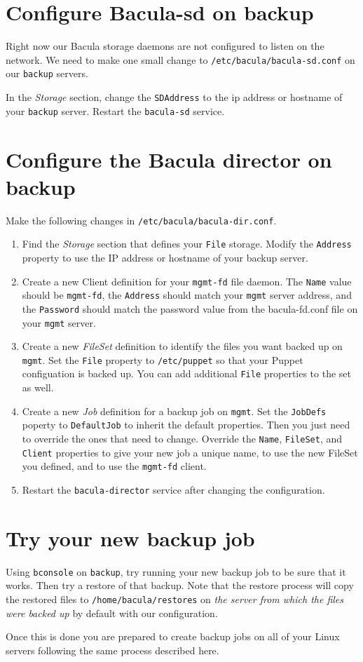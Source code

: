 \documentclass{article}   	%
\begin{document}
\section{Configure Bacula-sd on backup}
Right now our Bacula storage daemons are not configured to listen on the network.  We need to make one small change to \texttt{/etc/bacula/bacula-sd.conf} on our \texttt{backup} servers.

In the \emph{Storage} section, change the \texttt{SDAddress} to the ip address or hostname of your \texttt{backup} server.  Restart the \texttt{bacula-sd} service.

\section{Configure the Bacula director on backup}
Make the following changes in \texttt{/etc/bacula/bacula-dir.conf}.
\begin{enumerate}
  \item Find the \emph{Storage} section that defines your \texttt{File} storage.  Modify the \texttt{Address} property to use the IP address or hostname of your backup server.
  \item Create a new Client definition for your \texttt{mgmt-fd} file daemon.  The \texttt{Name} value should be \texttt{mgmt-fd}, the \texttt{Address} should match your \texttt{mgmt} server address, and the \texttt{Password} should match the password value from the bacula-fd.conf file on your \texttt{mgmt} server.
  \item Create a new \emph{FileSet} definition to identify the files you want backed up on \texttt{mgmt}.  Set the \texttt{File} property to \texttt{/etc/puppet} so that your Puppet configuation is backed up.  You can add additional \texttt{File} properties to the set as well.
  \item Create a new \emph{Job} definition for a backup job on \texttt{mgmt}.  Set the \texttt{JobDefs} poperty to \texttt{DefaultJob} to inherit the default properties.  Then you just need to override the ones that need to change.  Override the \texttt{Name}, \texttt{FileSet}, and \texttt{Client} properties to give your new job a unique name, to use the new FileSet you defined, and to use the \texttt{mgmt-fd} client.
  \item Restart the \texttt{bacula-director} service after changing the configuration.

\end{enumerate}

\section{Try your new backup job}
Using \texttt{bconsole} on \texttt{backup}, try running your new backup job to be sure that it works.  Then try a restore of that backup.  Note that the restore process will copy the restored files to \texttt{/home/bacula/restores} on \emph{the server from which the files were backed up} by default with our configuration.

Once this is done you are prepared to create backup jobs on all of your Linux servers following the same process described here.
\end{document}
